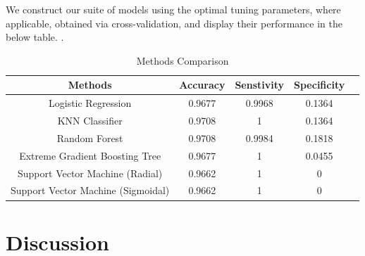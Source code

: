 \documentclass[12pt]{report}
\begin{document}
 We construct our suite of models using the optimal tuning parameters, where applicable, obtained via cross-validation, and display their performance in the below table. .

\begin{table}[ht]
\doublespacing
\centering
\caption{Methods Comparison}
\begin{tabular}{ccccc}
\label{modelcomp}
\textbf{Methods}          & \textbf{Accuracy} & \textbf{Senstivity} & \textbf{Specificity} \\ \hline
Logistic Regression       & 0.9677                  & 0.9968              & 0.1364              \\
KNN Classifier            & 0.9708                & 1             & 0.1364             \\
Random Forest             & 0.9708                  & 0.9984              & 0.1818              \\
Extreme Gradient Boosting Tree & 0.9677           & 1              & 0.0455\\
Support Vector Machine (Radial) & 0.9662           & 1              & 0             \\  
Support Vector Machine (Sigmoidal) & 0.9662           & 1             & 0
\end{tabular}

\end{table}



\section{Discussion}
\end{document}
